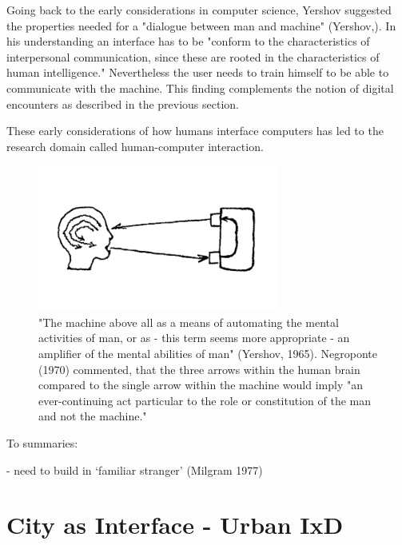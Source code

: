 Going back to the early considerations in computer science, Yershov suggested the properties needed for a "dialogue between man and machine" (Yershov,). In his understanding an interface has to be "conform to the characteristics of interpersonal communication, since these are rooted in the characteristics of human intelligence."
Nevertheless the user needs to train himself to be able to communicate with the machine. 
This finding complements the notion of digital encounters as described in the previous section.

These early considerations of how humans interface computers has led to the research domain called human-computer interaction.


\begin{figure}[h!] 
\centering
\includegraphics[width=8cm]{Illustrations/Yershov.png}
\caption [Director-agent interaction diagram by Yershov (1965)] {"The machine above all as a means of automating the mental activities of man, or as - this term seems more appropriate - an amplifier of the mental abilities of man" (Yershov, 1965). Negroponte (1970) commented, that the three arrows within the human brain compared to the single arrow within the machine would imply "an ever-continuing act particular to the role or constitution of the man and not the machine."}
\label{Yershov}
\end{figure}




To summaries: 

- need to build in ‘familiar stranger’ (Milgram 1977)

\section{City as Interface - Urban IxD}

